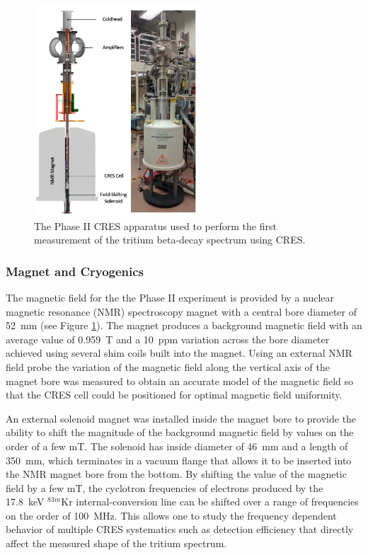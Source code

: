 \begin{figure}[htbp]
    \centering
    \includegraphics[width=0.55\textwidth]{figs/Chapter-3/phaseII_system.png}
    \caption{\label{fig:chap3-phase2-apparatus} The Phase II CRES apparatus used to perform the first measurement of the tritium beta-decay spectrum using CRES.}
\end{figure}

\subsubsection*{Magnet and Cryogenics}

The magnetic field for the the Phase II experiment is provided by a nuclear magnetic resonance (NMR) spectroscopy magnet with a central bore diameter of 52~mm (see Figure \ref{fig:chap3-phase2-apparatus}). The magnet produces a background magnetic field with an average value of 0.959~T and a 10~ppm variation across the bore diameter achieved using several shim coils built into the magnet. Using an external NMR field probe the variation of the magnetic field along the vertical axis of the magnet bore was measured to obtain an accurate model of the magnetic field so that the CRES cell could be positioned for optimal magnetic field uniformity.

An external solenoid magnet was installed inside the magnet bore to provide the ability to shift the magnitude of the background magnetic field by values on the order of a few mT. The solenoid has inside diameter of 46~mm and a length of 350~mm, which terminates in a vacuum flange that allows it to be inserted into the NMR magnet bore from the bottom. By shifting the value of the magnetic field by a few mT, the cyclotron frequencies of electrons produced by the 17.8~keV $^{83m}$Kr internal-conversion line can be shifted over a range of frequencies on the order of 100~MHz. This allows one to study the frequency dependent behavior of multiple CRES systematics such as detection efficiency that directly affect the measured shape of the tritium spectrum. 

